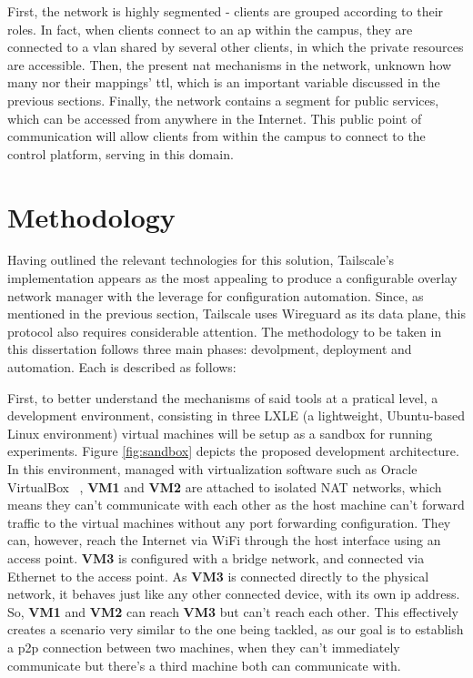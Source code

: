\documentclass[11pt,twoside,a4paper]{report}
\begin{document}
First, the network is highly segmented - clients are grouped according to their roles. In fact, when clients connect to an \ac{ap} within the campus, they are connected to a \ac{vlan} shared by several other clients, in which the private resources are accessible. Then, the present \ac{nat} mechanisms in the network, unknown how many nor their mappings' \ac{ttl}, which is an important variable discussed in the previous sections. Finally, the network contains a segment for public services, which can be accessed from anywhere in the Internet. This public point of communication will allow clients from within the campus to connect to the control platform, serving in this domain.

\chapter{Methodology}
\label{chapter:method}

Having outlined the relevant technologies for this solution, Tailscale's implementation appears as the most appealing to produce a configurable overlay network manager with the leverage for configuration automation. Since, as mentioned in the previous section, Tailscale uses Wireguard as its data plane, this protocol also requires considerable attention. The methodology to be taken in this dissertation follows three main phases: devolpment, deployment and automation. Each is described as follows:

First, to better understand the mechanisms of said tools at a pratical level, a development environment, consisting in three LXLE (a lightweight, Ubuntu-based Linux environment) virtual machines will be setup as a sandbox for running experiments. Figure \ref{fig:sandbox} depicts the proposed development architecture. In this environment, managed with virtualization software such as Oracle VirtualBox ~\cite{virtualbox}, \textbf{VM1} and \textbf{VM2} are attached to isolated NAT networks, which means they can't communicate with each other as the host machine can't forward traffic to the virtual machines without any port forwarding configuration. They can, however, reach the Internet via WiFi through the host interface using an access point. \textbf{VM3} is configured with a bridge network, and connected via Ethernet to the access point. As \textbf{VM3} is connected directly to the physical network, it behaves just like any other connected device, with its own \ac{ip} address. So, \textbf{VM1} and \textbf{VM2} can reach \textbf{VM3} but can't reach each other. This effectively creates a scenario very similar to the one being tackled, as our goal is to establish a \ac{p2p} connection between two machines, when they can't immediately communicate but there's a third machine both can communicate with.
\end{document}
